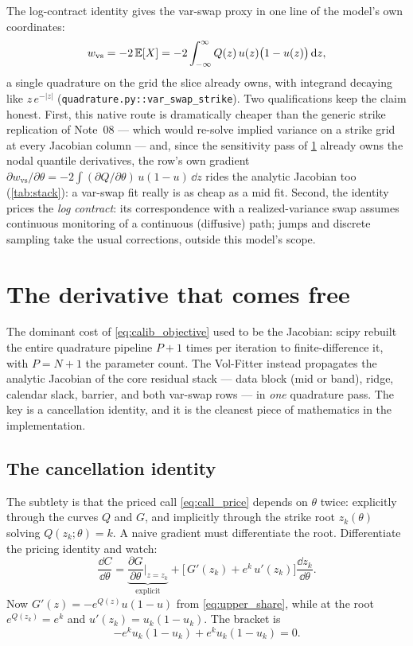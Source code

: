 \documentclass[11pt]{article}
\begin{document}
The log-contract identity gives the var-swap proxy in one line of the
model's own coordinates:
\begin{equation}
w_{\text{vs}}=-2\,\mathbb{E}[X]
=-2\int_{-\infty}^{\infty}Q(z)\,u(z)\big(1-u(z)\big)\,\mathrm{d} z,
\label{eq:varswap}
\end{equation}
a single quadrature on the grid the slice already owns, with integrand
decaying like $z\,e^{-|z|}$ (\texttt{quadrature.py::var\_swap\_strike}).  Two
qualifications keep the claim honest.  First, this native route is
dramatically cheaper than the generic strike replication of Note~08 --- which
would re-solve implied variance on a strike grid at every Jacobian column ---
and, since the sensitivity pass of \cref{sec:jacobian} already owns the nodal
quantile derivatives, the row's own gradient
$\partial w_{\text{vs}}/\partial\theta
=-2\int(\partial Q/\partial\theta)\,u(1-u)\,\dd z$
rides the analytic Jacobian too (\cref{tab:stack}): a var-swap fit really is
as cheap as a mid fit.
Second, the identity prices the \emph{log contract}: its correspondence with
a realized-variance swap assumes continuous monitoring of a continuous
(diffusive) path; jumps and discrete sampling take the usual corrections,
outside this model's scope.

\section{The derivative that comes free}
\label{sec:jacobian}

The dominant cost of \eqref{eq:calib_objective} used to be the Jacobian:
scipy rebuilt the entire quadrature pipeline $P+1$ times per iteration to
finite-difference it, with $P=N+1$ the parameter count.  The Vol-Fitter
instead propagates the analytic Jacobian of the core residual stack --- data
block (mid or band), ridge, calendar slack, barrier, and both var-swap rows
--- in \emph{one} quadrature pass.  The key is a cancellation identity, and it is the cleanest
piece of mathematics in the implementation.

\subsection{The cancellation identity}

The subtlety is that the priced call \eqref{eq:call_price} depends on
$\theta$ twice: explicitly through the curves $Q$ and $G$, and implicitly
through the strike root $z_k(\theta)$ solving $Q(z_k;\theta)=k$.  A naive
gradient must differentiate the root.  Differentiate the pricing identity
and watch:
\begin{equation}
\frac{\dd C}{\dd\theta}
=\underbrace{\frac{\partial G}{\partial\theta}\Big|_{z=z_k}}_{\text{explicit}}
+\Big[\,G'(z_k)+e^{k}\,u'(z_k)\Big]\frac{\dd z_k}{\dd\theta} .
\end{equation}
Now $G'(z)=-e^{Q(z)}u(1-u)$ from \eqref{eq:upper_share}, while at the root
$e^{Q(z_k)}=e^{k}$ and $u'(z_k)=u_k(1-u_k)$.  The bracket is
\begin{equation}
-e^{k}u_k(1-u_k)+e^{k}u_k(1-u_k)=0 .
\end{equation}
\end{document}
